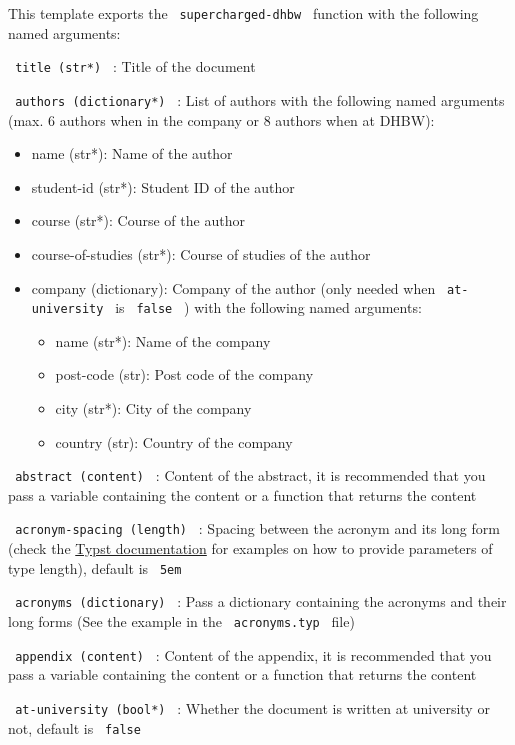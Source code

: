 This template exports the \texttt{\ supercharged-dhbw\ } function with
the following named arguments:

\texttt{\ title\ (str*)\ } : Title of the document

\texttt{\ authors\ (dictionary*)\ } : List of authors with the following
named arguments (max. 6 authors when in the company or 8 authors when at
DHBW):

\begin{itemize}
\tightlist
\item
  name (str*): Name of the author
\item
  student-id (str*): Student ID of the author
\item
  course (str*): Course of the author
\item
  course-of-studies (str*): Course of studies of the author
\item
  company (dictionary): Company of the author (only needed when
  \texttt{\ at-university\ } is \texttt{\ false\ } ) with the following
  named arguments:

  \begin{itemize}
  \tightlist
  \item
    name (str*): Name of the company
  \item
    post-code (str): Post code of the company
  \item
    city (str*): City of the company
  \item
    country (str): Country of the company
  \end{itemize}
\end{itemize}

\texttt{\ abstract\ (content)\ } : Content of the abstract, it is
recommended that you pass a variable containing the content or a
function that returns the content

\texttt{\ acronym-spacing\ (length)\ } : Spacing between the acronym and
its long form (check the
\href{https://typst.app/docs/reference/layout/length/}{Typst
documentation} for examples on how to provide parameters of type
length), default is \texttt{\ 5em\ }

\texttt{\ acronyms\ (dictionary)\ } : Pass a dictionary containing the
acronyms and their long forms (See the example in the
\texttt{\ acronyms.typ\ } file)

\texttt{\ appendix\ (content)\ } : Content of the appendix, it is
recommended that you pass a variable containing the content or a
function that returns the content

\texttt{\ at-university\ (bool*)\ } : Whether the document is written at
university or not, default is \texttt{\ false\ }

